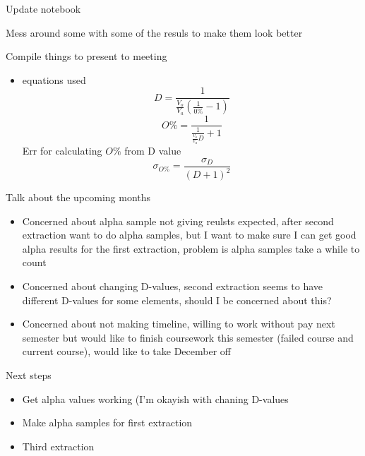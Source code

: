 \documentclass[idxtotoc,hyperref,openany,oneside]{labbook} %
\newcommand{\cmark}{\ding{51}}%
\newcommand{\done}{\rlap{$\square$}{\raisebox{2pt}{\large\hspace{1pt}\cmark}}%
  \hspace{-2.5pt}}
\begin{document}
\begin{todolist}
\item[\done]{Update notebook}
\item[\done]{Mess around some with some of the resuls to make
  them look better}
\item[\done]{Compile things to present to meeting}
  \begin{itemize}
  \item{equations used}
    \begin{equation*}
      D=\frac{1}{\frac{V_o}{V_a}\left(\frac{1}{0\%}-1\right)}
    \end{equation*}
    \begin{equation*}
      O\%=\frac{1}{\frac{1}{\frac{v_o}{v_a}D}+1}
    \end{equation*}
    Err for calculating $O\%$ from D value
    \begin{equation*}
       \sigma_{O\%}=\frac{\sigma_{D}}{(D+1)^2}
    \end{equation*}
  \end{itemize}
\item[\done]{Talk about the upcoming months}
  \begin{itemize}
  \item{Concerned about alpha sample not giving reulsts expected,
    after second extraction want to do alpha samples, but I want to
    make sure I can get good alpha results for the first extraction,
    problem is alpha samples take a while to count}
  \item{Concerned about changing D-values, second extraction seems
    to have different D-values for some elements, should I be concerned
  about this?}
  \item{Concerned about not making timeline, willing to work
    without pay next semester but would like to finish coursework
    this semester (failed course and current course), would like to
    take December off}
  \end{itemize}
\item{Next steps}
  \begin{itemize}
  \item{Get alpha values working (I'm okayish with chaning D-values}
  \item{Make alpha samples for first extraction}
  \item{Third extraction}
  \end{itemize}
\end{todolist}
\end{document}
